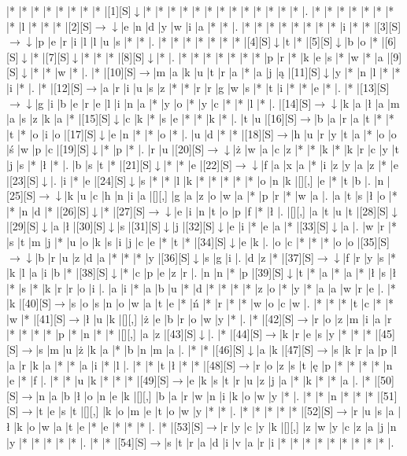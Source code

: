 \documentclass[11pt]{article}
\newcommand\drarr{$\rightarrow \!\!\!\!\! \downarrow$}
\newcommand\rarr{$\rightarrow$}
\newcommand\darr{$\downarrow$}
\begin{document}
\noindent\begin{Puzzle}{21}{33}|*	|*	|*	|*	|*	|*	|*	|*	|[1][S]\darr	|*	|*	|*	|*	|*	|*	|*	|*	|*	|*	|*	|*	|*	|.
|*	|*	|*	|*	|*	|*	|*	|*	|l	|*	|*	|*	|[2][S]\drarr	|e	|n	|d	|y	|w	|i	|a	|*	|*	|.
|*	|*	|*	|*	|*	|*	|*	|*	|i	|*	|*	|[3][S]\drarr	|p	|e	|r	|i	|l	|l	|u	|s	|*	|*	|.
|*	|*	|*	|*	|*	|*	|*	|[4][S]\darr	|t	|*	|[5][S]\darr	|b	|o	|*	|[6][S]\darr	|*	|[7][S]\darr	|*	|*	|*	|[8][S]\darr	|*	|.
|*	|*	|*	|*	|*	|*	|*	|p	|r	|*	|k	|e	|s	|*	|w	|*	|a	|[9][S]\darr	|*	|*	|w	|*	|.
|*	|[10][S]\rarr	|m	|a	|k	|u	|t	|r	|a	|*	|a	|j	|ą	|[11][S]\darr	|y	|*	|n	|l	|*	|*	|i	|*	|.
|*	|[12][S]\rarr	|a	|r	|i	|u	|s	|z	|*	|*	|r	|r	|g	|w	|s	|*	|t	|i	|*	|*	|e	|*	|.
|*	|[13][S]\drarr	|g	|i	|b	|e	|r	|e	|l	|i	|n	|a	|*	|y	|o	|*	|y	|c	|*	|*	|l	|*	|.
|[14][S]\drarr	|k	|a	|ł	|a	|m	|a	|s	|z	|k	|a	|*	|[15][S]\darr	|c	|k	|*	|s	|e	|*	|*	|k	|*	|.
|t	|u	|[16][S]\rarr	|b	|a	|r	|a	|t	|*	|*	|t	|*	|o	|i	|o	|[17][S]\darr	|e	|n	|*	|*	|o	|*	|.
|u	|d	|*	|*	|[18][S]\rarr	|h	|u	|r	|y	|t	|a	|*	|o	|o	|ś	|w	|p	|c	|[19][S]\darr	|*	|p	|*	|.
|r	|u	|[20][S]\drarr	|ż	|w	|a	|c	|z	|*	|*	|k	|*	|k	|r	|c	|y	|t	|j	|s	|*	|ł	|*	|.
|b	|s	|t	|*	|[21][S]\darr	|*	|*	|e	|[22][S]\drarr	|f	|a	|x	|a	|*	|i	|z	|y	|a	|z	|*	|e	|[23][S]\darr	|.
|i	|*	|e	|[24][S]\darr	|s	|*	|*	|l	|k	|*	|*	|*	|*	|*	|o	|n	|k	|[][,]{ }	|e	|*	|t	|b	|.
|n	|[25][S]\drarr	|k	|u	|c	|h	|n	|i	|a	|[][,]{ }	|g	|a	|z	|o	|w	|a	|*	|p	|r	|*	|w	|a	|.
|a	|t	|s	|ł	|o	|*	|*	|n	|d	|*	|[26][S]\darr	|*	|[27][S]\drarr	|e	|i	|n	|t	|o	|p	|f	|*	|ł	|.
|[][,]{ }	|a	|t	|u	|t	|[28][S]\darr	|[29][S]\darr	|a	|ł	|[30][S]\darr	|s	|[31][S]\darr	|j	|[32][S]\darr	|e	|i	|*	|e	|a	|*	|[33][S]\darr	|a	|.
|w	|r	|*	|s	|t	|m	|j	|*	|u	|o	|k	|s	|i	|j	|c	|e	|*	|t	|*	|[34][S]\darr	|e	|k	|.
|o	|c	|*	|*	|*	|o	|o	|[35][S]\drarr	|b	|r	|u	|z	|d	|a	|*	|*	|*	|y	|[36][S]\darr	|s	|g	|i	|.
|d	|z	|*	|[37][S]\drarr	|f	|r	|y	|s	|*	|k	|l	|a	|i	|b	|*	|[38][S]\darr	|*	|c	|p	|e	|z	|r	|.
|n	|n	|*	|p	|[39][S]\darr	|t	|*	|a	|*	|a	|*	|ł	|s	|ł	|*	|s	|*	|k	|r	|r	|o	|i	|.
|a	|i	|*	|a	|b	|u	|*	|d	|*	|*	|*	|*	|z	|o	|*	|y	|*	|a	|a	|w	|r	|e	|.
|*	|k	|[40][S]\rarr	|s	|o	|s	|n	|o	|w	|a	|t	|e	|*	|ń	|*	|r	|*	|*	|w	|o	|c	|w	|.
|*	|*	|*	|t	|c	|*	|*	|w	|*	|[41][S]\rarr	|ł	|u	|k	|[][,]{ }	|ż	|e	|b	|r	|o	|w	|y	|*	|.
|*	|[42][S]\rarr	|r	|o	|z	|m	|i	|a	|r	|*	|*	|*	|*	|p	|*	|n	|*	|*	|[][,]{ }	|a	|z	|[43][S]\darr	|.
|*	|[44][S]\rarr	|k	|r	|e	|s	|y	|*	|*	|*	|[45][S]\rarr	|s	|m	|u	|ż	|k	|a	|*	|b	|n	|m	|a	|.
|*	|*	|[46][S]\darr	|a	|k	|[47][S]\rarr	|s	|k	|r	|a	|p	|l	|a	|r	|k	|a	|*	|*	|a	|i	|*	|l	|.
|*	|*	|t	|ł	|*	|*	|[48][S]\rarr	|r	|o	|z	|s	|t	|ę	|p	|*	|*	|*	|*	|n	|e	|*	|f	|.
|*	|*	|u	|k	|*	|*	|*	|[49][S]\rarr	|e	|k	|s	|t	|r	|u	|z	|j	|a	|*	|k	|*	|*	|a	|.
|*	|[50][S]\rarr	|n	|a	|b	|ł	|o	|n	|e	|k	|[][,]{ }	|b	|a	|r	|w	|n	|i	|k	|o	|w	|y	|*	|.
|*	|*	|n	|*	|*	|*	|[51][S]\rarr	|t	|e	|s	|t	|[][,]{ }	|k	|o	|m	|e	|t	|o	|w	|y	|*	|*	|.
|*	|*	|*	|*	|*	|[52][S]\rarr	|r	|u	|s	|a	|ł	|k	|o	|w	|a	|t	|e	|*	|e	|*	|*	|*	|.
|*	|[53][S]\rarr	|r	|y	|c	|y	|k	|[][,]{ }	|z	|w	|y	|c	|z	|a	|j	|n	|y	|*	|*	|*	|*	|*	|.
|*	|*	|[54][S]\rarr	|s	|t	|r	|a	|d	|i	|v	|a	|r	|i	|*	|*	|*	|*	|*	|*	|*	|*	|*	|.\end{Puzzle}
\end{document}
